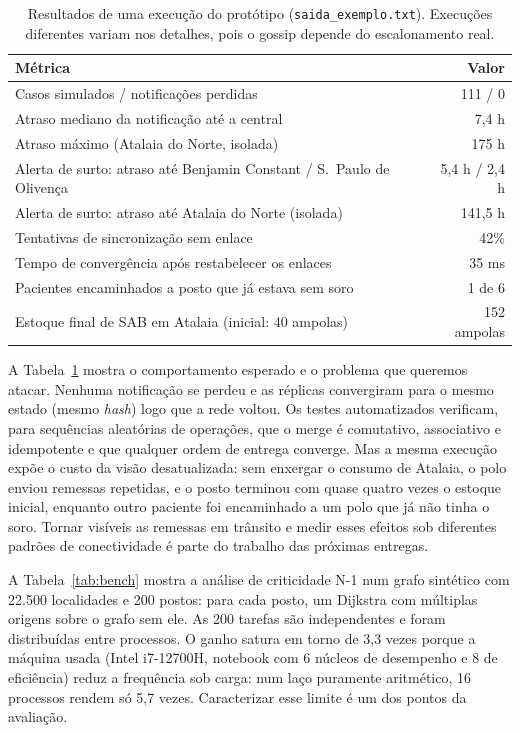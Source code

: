 \documentclass[a4paper,12pt]{article}
\begin{document}
\begin{table}[H]
  \centering
  \caption{Resultados de uma execução do protótipo (\texttt{saida\_exemplo.txt}).
  Execuções diferentes variam nos detalhes, pois o gossip depende do escalonamento real.}
  \label{tab:demo}
  \begin{tabularx}{\textwidth}{Xr}
    \toprule
    \textbf{Métrica} & \textbf{Valor} \\
    \midrule
    Casos simulados / notificações perdidas & 111 / 0 \\
    Atraso mediano da notificação até a central & 7,4 h \\
    Atraso máximo (Atalaia do Norte, isolada) & 175 h \\
    Alerta de surto: atraso até Benjamin Constant / S.~Paulo de Olivença & 5,4 h / 2,4 h \\
    Alerta de surto: atraso até Atalaia do Norte (isolada) & 141,5 h \\
    Tentativas de sincronização sem enlace & 42\% \\
    Tempo de convergência após restabelecer os enlaces & 35 ms \\
    Pacientes encaminhados a posto que já estava sem soro & 1 de 6 \\
    Estoque final de SAB em Atalaia (inicial: 40 ampolas) & 152 ampolas \\
    \bottomrule
  \end{tabularx}
\end{table}

A Tabela~\ref{tab:demo} mostra o comportamento esperado e o problema que
queremos atacar. Nenhuma notificação se perdeu e as réplicas convergiram
para o mesmo estado (mesmo \emph{hash}) logo que a rede voltou. Os testes
automatizados verificam, para sequências aleatórias de operações, que o merge
é comutativo, associativo e idempotente e que qualquer ordem de entrega
converge. Mas a mesma execução expõe o custo da visão desatualizada: sem
enxergar o consumo de Atalaia, o polo enviou remessas repetidas, e o posto
terminou com quase quatro vezes o estoque inicial, enquanto outro paciente
foi encaminhado a um polo que já não tinha o soro. Tornar visíveis as remessas
em trânsito e medir esses efeitos sob diferentes padrões de conectividade é
parte do trabalho das próximas entregas.

A Tabela~\ref{tab:bench} mostra a análise de criticidade N-1 num grafo
sintético com 22.500 localidades e 200 postos: para cada posto, um Dijkstra
com múltiplas origens sobre o grafo sem ele. As 200 tarefas são independentes
e foram distribuídas entre processos. O ganho satura em torno de 3,3 vezes
porque a máquina usada (Intel i7-12700H, notebook com 6 núcleos de desempenho
e 8 de eficiência) reduz a frequência sob carga: num laço puramente
aritmético, 16 processos rendem só 5,7 vezes. Caracterizar esse limite é um
dos pontos da avaliação.
\end{document}
